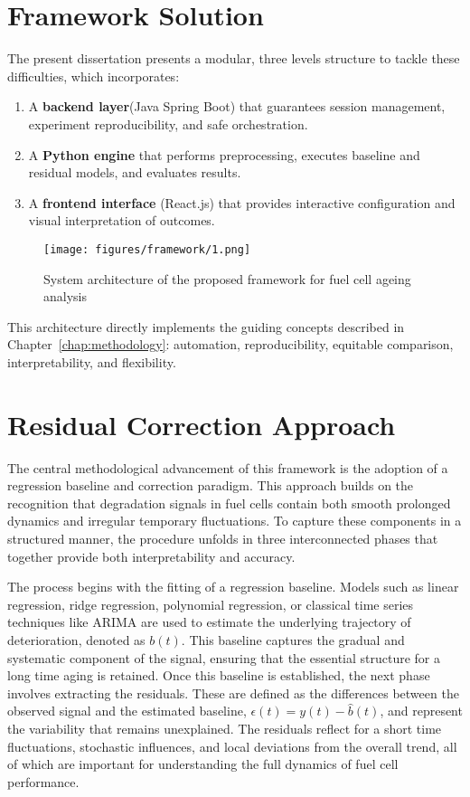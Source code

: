 \section{Framework Solution}
The present dissertation presents a modular, three levels structure to tackle these difficulties, which incorporates:
\begin{enumerate}
    \item A \textbf{backend layer}(Java Spring Boot) that guarantees session management, experiment reproducibility, and safe orchestration.
    \item A \textbf{Python engine} that performs preprocessing, executes baseline and residual models, and evaluates results.  
    \item A \textbf{frontend interface} (React.js) that provides interactive configuration and visual interpretation of outcomes.  
\end{enumerate}

\begin{figure}[htbp]
 \texttt{[image: figures/framework/1.png]}
 \caption[System architecture of the proposed framework for fuel cell ageing analysis]{System architecture of the proposed framework for fuel cell ageing analysis}
 \label{fig:system_architecture}
\end{figure}
This architecture directly implements the guiding concepts described in Chapter~\ref{chap:methodology}: automation, reproducibility, equitable comparison, interpretability, and flexibility.

\section{Residual Correction Approach}

The central methodological advancement of this framework is the adoption of a regression baseline and correction paradigm. This approach builds on the recognition that degradation signals in fuel cells contain both smooth prolonged dynamics and irregular temporary fluctuations. To capture these components in a structured manner, the procedure unfolds in three interconnected phases that together provide both interpretability and accuracy.

The process begins with the fitting of a regression baseline. Models such as linear regression, ridge regression, polynomial regression, or classical time series techniques like ARIMA are used to estimate the underlying trajectory of deterioration, denoted as $b(t)$. This baseline captures the gradual and systematic component of the signal, ensuring that the essential structure  for a long time aging is retained. Once this baseline is established, the next phase involves extracting the residuals. These are defined as the differences between the observed signal and the estimated baseline, $\epsilon(t) = y(t) - \hat{b}(t)$, and represent the variability that remains unexplained. The residuals reflect for a short time fluctuations, stochastic influences, and local deviations from the overall trend, all of which are important for understanding the full dynamics of fuel cell performance.

